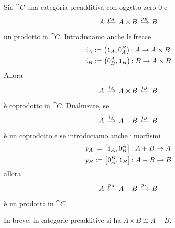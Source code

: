 \begin{proposition}\label{proposition:BinProdsAreBinCoprods}
  Sia \(\cat C\) una categoria preadditiva con oggetto zero \(0\) e
  \[
    \begin{tikzcd}[column sep=small]
      A & A \times B \ar["{p_A}", l, swap] \ar["{p_B}", r] & B
    \end{tikzcd}
  \]
  un prodotto in \(\cat C\).  Introduciamo anche le frecce
  \begin{equation}
    \label{eq:InjViaProj}
    \begin{aligned}
      & i_A := \left( \mathtt 1_A, 0_A^B \right) : A \to A \times B \\
      & i_B := \left( 0_B^A, \mathtt 1_B \right) : B \to A \times B
    \end{aligned}
  \end{equation}
  Allora
  \[
    \begin{tikzcd}[column sep=small]
      A \ar["{i_A}", r] & A \times B & B \ar["{i_B}", l, swap]
    \end{tikzcd}
  \]
  è coprodotto in \(\cat C\). Dualmente, se
  \[
    \begin{tikzcd}[column sep=small]
      A \ar["{i_A}", r] & A + B & B \ar["{i_B}", l, swap]
    \end{tikzcd}
  \]
  è un coprodotto e se introduciamo anche i morfismi
  \begin{equation}
    \label{eq:ProjViaInj}
    \begin{aligned}
      & p_A := \left[ \mathtt 1_A, 0_B^A \right] : A + B \to A \\
      & p_B := \left[ 0_A^B, \mathtt 1_B \right] : A + B \to B
    \end{aligned}
  \end{equation}
  allora
  \[
    \begin{tikzcd}[column sep=small]
      A & A + B \ar["{p_A}", l, swap] \ar["{p_B}", r] & B
    \end{tikzcd}
  \]
  è un prodotto in \(\cat C\).
\end{proposition}

In breve: in categorie preadditive si ha \(A \times B \cong A+B\).

